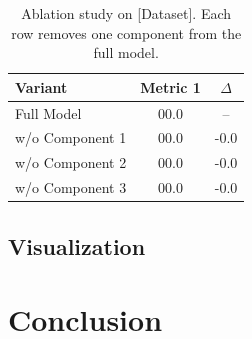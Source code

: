 \documentclass[10pt,twocolumn,letterpaper]{article}
\begin{document}

\begin{table}[t]
  \centering
  \caption{Ablation study on [Dataset]. Each row removes one component from the full model.}
  \label{tab:ablation}
  \begin{tabular}{lcc}
    \toprule
    \textbf{Variant} & \textbf{Metric 1} & \textbf{$\Delta$} \\
    \midrule
    Full Model & 00.0 & -- \\
    w/o Component 1 & 00.0 & -0.0 \\
    w/o Component 2 & 00.0 & -0.0 \\
    w/o Component 3 & 00.0 & -0.0 \\
    \bottomrule
  \end{tabular}
\end{table}

\subsection{Visualization}
\label{sec:exp-visual}


\section{Conclusion}
\label{sec:conclusion}



{
  \small
  
  
}
\end{document}
